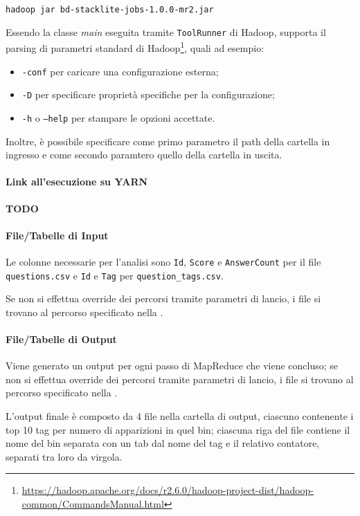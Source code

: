   \texttt{hadoop jar bd-stacklite-jobs-1.0.0-mr2.jar}

  Essendo la classe \textit{main} eseguita tramite \texttt{ToolRunner} di Hadoop,
  supporta il parsing di parametri standard di Hadoop\footnote{\url{https://hadoop.apache.org/docs/r2.6.0/hadoop-project-dist/hadoop-common/CommandsManual.html}}, quali ad esempio:
  \begin{itemize}
    \item \texttt{-conf} per caricare una configurazione esterna;
    \item \texttt{-D} per specificare proprietà specifiche per la configurazione;
    \item \texttt{-h} o \texttt{--help} per stampare le opzioni accettate.
  \end{itemize}

  Inoltre, è possibile specificare come primo parametro il path della cartella in ingresso e come secondo paramtero quello della cartella in uscita.

  \paragraph{Link all'esecuzione su YARN}\label{par:job2:mapreduce:yarn}

  \textbf{TODO}

  \paragraph{File/Tabelle di Input}\label{par:job2:mapreduce:input}

  Le colonne necessarie per l'analisi sono \texttt{Id}, \texttt{Score} e \texttt{AnswerCount} per il file \texttt{questions.csv}
  e \texttt{Id} e \texttt{Tag} per \texttt{question\_tags.csv}.

  Se non si effettua override dei percorsi tramite parametri di lancio, i file si trovano al percorso specificato nella .

  \paragraph{File/Tabelle di Output}\label{par:job2:mapreduce:output}

  Viene generato un output per ogni passo di MapReduce che viene concluso;
  se non si effettua override dei percorsi tramite parametri di lancio, i file si trovano al percorso specificato nella .

  L'output finale è composto da 4 file nella cartella di output, ciascuno contenente i top 10 tag per numero di apparizioni in quel bin;
  ciascuna riga del file contiene il nome del bin separata con un tab dal nome del tag e il relativo contatore, separati tra loro da virgola.

